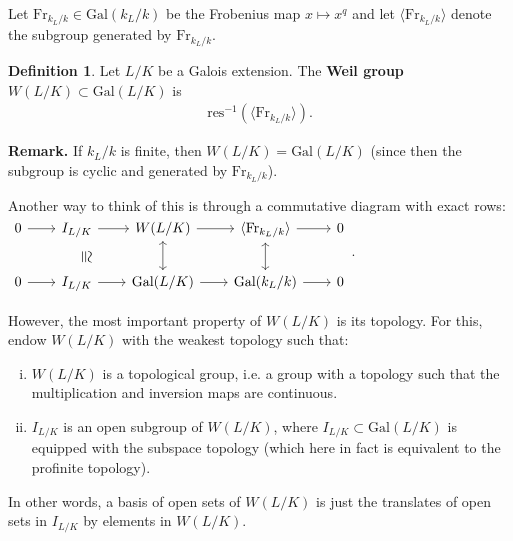 \documentclass{article}
\theoremstyle{definition}
\newtheorem{defn}{Definition}[section]
\begin{document}
Let $\text{Fr}_{k_L/k} \in \text{Gal}(k_L/k)$ be the Frobenius map $x \mapsto x^q$ and let $\langle \text{Fr}_{k_L/k} \rangle$ denote the subgroup generated by $\text{Fr}_{k_L/k}$. 
\begin{defn}
    Let $L/K$ be a Galois extension. The \textbf{Weil group} $W(L/K) \subset \text{Gal}(L/K)$ is \begin{align*}
        \text{res}^{-1}(\langle \text{Fr}_{k_L/k} \rangle).
    \end{align*}
\end{defn}
\textbf{Remark.} If $k_L/k$ is finite, then $W(L/K) = \text{Gal}(L/K)$ (since then the subgroup is cyclic and generated by $\text{Fr}_{k_L/k}$).
\vspace{1mm}
 
Another way to think of this is through a commutative diagram with exact rows:
$\begin{tikzcd}[row sep=2em, column sep=2em]
0\rar & I_{L/K} \dar[draw=none, "\LARGE\cong" {sloped, anchor=south}] \rar[""] & W(L/K) \dar[leftrightarrow] \rar[""]& \langle \text{Fr}_{k_L/k} \rangle \dar[leftrightarrow] \rar & 0 \\
0\rar & I_{L/K} \rar[""]& \text{Gal}(L/K) \rar[""]& \text{Gal}(k_L/k) \rar & 0
\end{tikzcd}$.
\vspace{1mm}
 
However, the most important property of $W(L/K)$ is its topology. For this, endow $W(L/K)$ with the weakest topology such that:
\begin{enumerate}[(i)]
    \item $W(L/K)$ is a topological group, i.e. a group with a topology such that the multiplication and inversion maps are continuous.
    \item $I_{L/K}$ is an open subgroup of $W(L/K)$, where $I_{L/K} \subset \text{Gal}(L/K)$ is equipped with the subspace topology (which here in fact is equivalent to the profinite topology).
\end{enumerate}
In other words, a basis of open sets of $W(L/K)$ is just the translates of open sets in $I_{L/K}$ by elements in $W(L/K)$.
\vspace{1mm}
 
\end{document}
